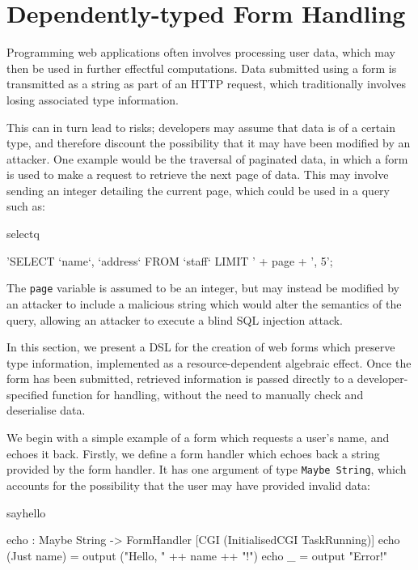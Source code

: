 \section{Dependently-typed Form Handling}

\label{form}
Programming web applications often involves processing user data, which may
then be used in further effectful computations. Data submitted using a form is
transmitted as a string as part of an HTTP request, which
traditionally involves losing associated type information.

This can in turn lead to risks; developers may assume that data is
of a certain type, and therefore discount the possibility that it may have been
modified by an attacker. One example would be the traversal of paginated data,
in which a form is used to make a request to retrieve the next page of data.
This may involve sending an integer detailing the current page, which could be
used in a query such as:

\begin{SaveVerbatim}{selectq}

'SELECT `name`, `address` FROM `staff` LIMIT ' + 
       page + ', 5';

\end{SaveVerbatim}

\noindent
The \texttt{page} variable is assumed to be an integer, but may instead be
modified by an attacker to include a malicious string which would alter the
semantics of the query, allowing an attacker to execute a blind SQL injection
attack. %

In this section, we present a DSL
for the creation of web forms which preserve type information, implemented
as a resource-dependent algebraic effect. Once the form has
been submitted, retrieved information is passed directly to a
developer-specified function for handling, without the need to manually check
and deserialise data. 

We begin with a simple example of a form which requests a user's name, and
echoes it back. Firstly, we define a form handler which echoes back a string
provided by the form handler. It has one argument of type \texttt{Maybe
String}, which accounts for the possibility that the user may have 
provided invalid data:

\begin{SaveVerbatim}{sayhello}

echo : Maybe String -> 
     FormHandler [CGI (InitialisedCGI TaskRunning)]
echo (Just name) = output ("Hello, " ++ name ++ "!")
echo _ = output "Error!"

\end{SaveVerbatim}

